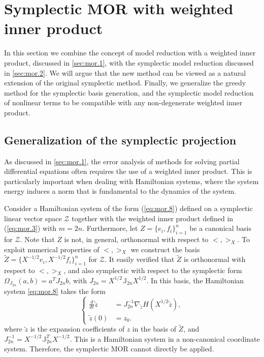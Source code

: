 \section{Symplectic MOR with weighted inner product} \label{sec:normmor}

In this section we combine the concept of model reduction with a weighted inner product, discussed in \cref{sec:mor.1}, with the symplectic model reduction discussed in \cref{sec:mor.2}. We will argue that the new method can be viewed as a natural extension of the original symplectic method. Finally, we generalize the greedy method for the symplectic basis generation, and the symplectic model reduction of nonlinear terms to be compatible with any non-degenerate weighted inner product.

\subsection{Generalization of the symplectic projection} \label{sec:normmor.1}
As discussed in \cref{sec:mor.1}, the error analysis of methods for solving partial differential equations often requires the use of a weighted inner product. This is particularly important when dealing with Hamiltonian systems, where the system energy induces a norm that is fundamental to the dynamics of the system.
   
Consider a Hamiltonian system of the form (\ref{eq:mor.8}) defined on a symplectic linear vector space $\mathcal Z$ together with the weighted inner product defined in (\ref{eq:mor.3}) with $m=2n$. Furthermore, let $Z = \{ e_i,f_i \}_{i=1}^n$ be a canonical basis for $\mathcal Z$. Note that $Z$ is not, in general, orthonormal with respect to $<,>_X$. To exploit numerical properties of $<,>_X$ we construct the basis $\tilde Z = \{ X^{-1/2}e_i,X^{-1/2}f_i \}_{i=1}^{n}$ for $\mathcal Z$. It easily verified that $\tilde Z$ is orthonormal with respect to $<,>_{X}$, and also symplectic with respect to the symplectic form $\Omega_{J_{2n}}(a,b) = a^T J_{2n} b $, with $J_{2n} = X^{1/2} \mathbb J_{2n}X^{1/2}$. In this basis, the Hamiltonian system \eqref{eq:mor.8} takes the form
\begin{equation} \label{p1.eq:nommor.0.1}
	\left\{
	\begin{aligned}
		\frac d {dt} \tilde z &= J^{-1}_{2n} \nabla_{\tilde z} H(X^{1/2}\tilde{z}), \\
		\tilde z(0) &= z_0.
	\end{aligned}
	\right.	
\end{equation}
where $\tilde z$ is the expansion coefficients of $z$ in the basis of $\tilde Z$, and $J_{2n}^{-1} = X^{-1/2} \mathbb J_{2n}^T X^{-1/2}$. This is a Hamiltonian system in a non-canonical coordinate system. Therefore, the symplectic MOR cannot directly be applied. 

